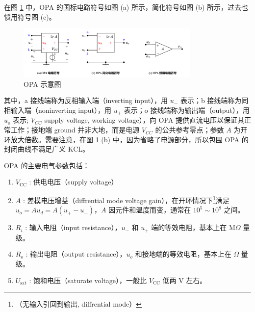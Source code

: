 \documentclass[UTF8]{report}
\theoremstyle{MyLineTheoremStyle} %
\theoremstyle{MyBlockTheoremStyle} %
\theoremstyle{MySubsubsectionStyle} %
\begin{document}
在图 \ref{OPA 示意图} 中，OPA 的国标电路符号如图 (a) 所示，简化符号如图 (b) 所示，过去也惯用符号图 (c)。
\begin{figure}[H]\centering
\includegraphics[width=0.8\textwidth]{assets/1,2/OPA运放.drawio.pdf}
\caption{OPA 示意图}\label{OPA 示意图}
\end{figure}

其中，a 接线端称为反相输入端（inverting input），用 $u_-$ 表示；b 接线端称为同相输入端（noninverting input），用 $u_+$ 表示；o 接线端称为输出端（output），用 $u_o$ 表示; $V_{CC}$ supply voltage, working voltage），向 OPA 提供直流电压以保证其正常工作；接地端 ground 并非大地，而是电源 $V_{CC}$ 的公共参考零点；参数 $A$ 为开环放大倍数。需要注意，在图 \ref{OPA 示意图} (b) 中，因为省略了电源部分，所以包围 OPA 的封闭曲线不满足广义 KCL。

OPA 的主要电气参数包括：
\begin{enumerate}
\item $V_\text{CC}$ : 供电电压（supply voltage）
\item $A$ : 差模电压增益（diffrential mode voltage gain），在开环情况下\footnote{（无输入引回到输出, diffrential mode）}满足 $u_o = Au_d = A(u_+-u_-) $，$A$ 因元件和温度而变，通常在 $10^5\sim 10^8$ 之间。
\item $R_i$ : 输入电阻（input resistance），$u_-$ 和 $u_+$ 端的等效电阻，基本上在 $\mathrm{M} \Omega$ 量级。
\item $R_o$ : 输出电阻（output resistance），$u_o$ 和接地端的等效电阻，基本上在 $\Omega$ 量级。
\item $U_{\text{sat}}$ : 饱和电压（saturate voltage），一般比 $V_{\text{CC}}$ 低两 $\mathrm{V}$ 左右。
\end{enumerate}
\end{document}

